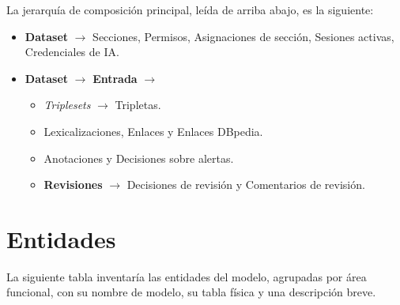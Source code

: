 La jerarquía de composición principal, leída de arriba abajo, es la siguiente:

\begin{itemize}
	\item \textbf{Dataset} \(\rightarrow\) Secciones, Permisos, Asignaciones de sección,
	      Sesiones activas, Credenciales de IA.
	\item \textbf{Dataset} \(\rightarrow\) \textbf{Entrada} \(\rightarrow\)
	      \begin{itemize}
		      \item \textit{Triplesets} \(\rightarrow\) Tripletas.
		      \item Lexicalizaciones, Enlaces y Enlaces DBpedia.
		      \item Anotaciones y Decisiones sobre alertas.
		      \item \textbf{Revisiones} \(\rightarrow\) Decisiones de revisión y Comentarios de
		            revisión.
	      \end{itemize}
\end{itemize}

\section{Entidades}

La siguiente tabla inventaría las entidades del modelo, agrupadas por área
funcional, con su nombre de modelo, su tabla física y una descripción breve.

